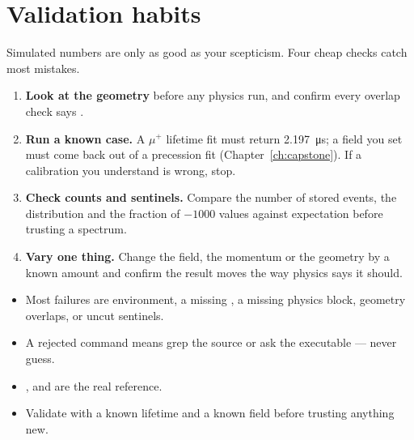 \section{Validation habits}
Simulated numbers are only as good as your scepticism. Four cheap checks catch most mistakes.
\begin{enumerate}
  \item \textbf{Look at the geometry} before any physics run, and confirm every overlap check says .
  \item \textbf{Run a known case.} A \(\mu^+\) lifetime fit must return \SI{2.197}{\micro s}; a field you set must come back out of a precession fit (Chapter~\ref{ch:capstone}). If a calibration you understand is wrong, stop.
  \item \textbf{Check counts and sentinels.} Compare the number of stored events, the  distribution and the fraction of \(-1000\) values against expectation before trusting a spectrum.
  \item \textbf{Vary one thing.} Change the field, the momentum or the geometry by a known amount and confirm the result moves the way physics says it should.
\end{enumerate}

\begin{recap}
\begin{itemize}
  \item Most failures are environment, a missing , a missing physics block, geometry overlaps, or uncut sentinels.
  \item A rejected command means grep the source or ask the executable --- never guess.
  \item {},  and  are the real reference.
  \item Validate with a known lifetime and a known field before trusting anything new.
\end{itemize}
\end{recap}
